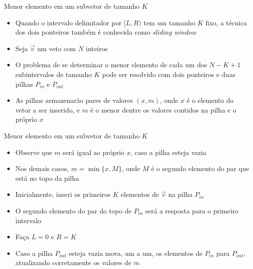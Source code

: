 \begin{frame}[fragile]{Menor elemento em um subvetor de tamanho $K$}

    \begin{itemize}
        \item Quando o intervalo delimitador por $[L, R)$ tem um tamanho $K$ fixo, a técnica dos
            dois ponteiros também é conhecida como \textit{sliding window}

        \item Seja $\vec{v}$ um veto com $N$ inteiros

        \item O problema de se determinar o menor elemento de cada um dos $N - K + 1$ subintervalos
            de tamanho $K$ pode ser resolvido com dois ponteiros e duas pilhas $P_{in}$ e 
            $P_{out}$

        \item As pilhas armazenarão pares de valores $(x, m)$, onde $x$ é o elemento do vetor a
            ser inserido, e $m$ é o menor dentre os valores contidos na pilha e o próprio $x$
    \end{itemize}

\end{frame}

\begin{frame}[fragile]{Menor elemento em um subvetor de tamanho $K$}

    \begin{itemize}
        \item Observe que $m$ será igual ao próprio $x$, caso a pilha esteja vazia

        \item Nos demais casos, $m = \min\{ x, M \}$, onde $M$ é o segundo elemento do par que
            está no topo da pilha

        \item Inicialmente, inseri os primeiros $K$ elementos de $\vec{v}$ na pilha $P_{in}$

        \item O segundo elemento do par do topo de $P_{in}$ será a resposta para o primeiro 
            intervalo

        \item Faça $L = 0$ e $R = K$

        \item Caso a pilha $P_{out}$ esteja vazia mova, um a um, os elementos de $P_{in}$ para
            $P_{out}$, atualizando corretamente os valores de $m$

    \end{itemize}

\end{frame}

